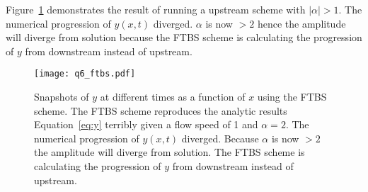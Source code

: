\documentclass{article}
\begin{document}
\begin{homeworkProblem}

    Figure~\ref{fig:q6_ftbs} demonstrates the result of running a upstream
    scheme with $|\alpha| > 1$. The numerical progression of $y(x,t)$ diverged.
    $\alpha$ is now $> 2$ hence the amplitude will diverge from solution
    because the FTBS scheme is calculating the progression of $y$ from
    downstream instead of upstream.

    \begin{figure}[!ht]
    \begin{center}
        \texttt{[image: q6\_ftbs.pdf]} %

        \caption{\label{fig:q6_ftbs} Snapshots of $y$ at different times as a
        function of $x$ using the FTBS scheme. The FTBS scheme reproduces the
        analytic results Equation~\ref{eq:y} terribly given a flow speed of 1
        and $\alpha = 2$. The numerical progression of $y(x,t)$ diverged.
        Because $\alpha$ is now $> 2$ the amplitude will diverge from solution.
        The FTBS scheme is calculating the progression of $y$ from downstream
        instead of upstream.}

    \end{center}
    \end{figure}

\end{homeworkProblem}
\clearpage
\end{document}
